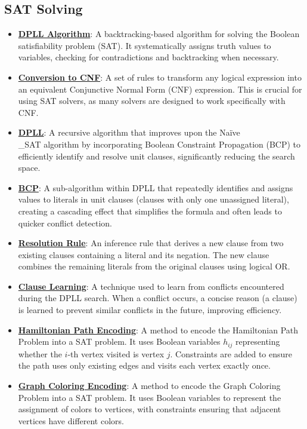 \documentclass{article}%
\begin{document}
\subsection{SAT Solving}%
\label{subsec:SATSolving}%
\begin{itemize}[leftmargin=*]%
\item \href{https://www.math.purdue.edu/~yipn/351/13L1-Logic.pdf#page=15}{\textbf{DPLL Algorithm}}: A backtracking-based algorithm for solving the Boolean satisfiability problem (SAT). It systematically assigns truth values to variables, checking for contradictions and backtracking when necessary.%
\item \href{https://www.math.purdue.edu/~yipn/351/13L1-Logic.pdf#page=17}{\textbf{Conversion to CNF}}: A set of rules to transform any logical expression into an equivalent Conjunctive Normal Form (CNF) expression. This is crucial for using SAT solvers, as many solvers are designed to work specifically with CNF.%
\item \href{https://www.math.purdue.edu/~yipn/351/15L2-SAT.pdf#page=17}{\textbf{DPLL}}: A recursive algorithm that improves upon the Naïve\\_SAT algorithm by incorporating Boolean Constraint Propagation (BCP) to efficiently identify and resolve unit clauses, significantly reducing the search space.%
\item \href{https://www.math.purdue.edu/~yipn/351/15L2-SAT.pdf#page=20}{\textbf{BCP}}: A sub-algorithm within DPLL that repeatedly identifies and assigns values to literals in unit clauses (clauses with only one unassigned literal), creating a cascading effect that simplifies the formula and often leads to quicker conflict detection.%
\item \href{https://www.math.purdue.edu/~yipn/351/15L2-SAT.pdf#page=32}{\textbf{Resolution Rule}}: An inference rule that derives a new clause from two existing clauses containing a literal and its negation. The new clause combines the remaining literals from the original clauses using logical OR.%
\item \href{https://www.math.purdue.edu/~yipn/351/15L2-SAT.pdf#page=35}{\textbf{Clause Learning}}: A technique used to learn from conflicts encountered during the DPLL search. When a conflict occurs, a concise reason (a clause) is learned to prevent similar conflicts in the future, improving efficiency.%
\item \href{https://www.math.purdue.edu/~yipn/351/15L2-SAT.pdf#page=46}{\textbf{Hamiltonian Path Encoding}}: A method to encode the Hamiltonian Path Problem into a SAT problem. It uses Boolean variables $h_{ij}$ representing whether the $i$-th vertex visited is vertex $j$. Constraints are added to ensure the path uses only existing edges and visits each vertex exactly once.%
\item \href{https://www.math.purdue.edu/~yipn/351/15L2-SAT.pdf#page=47}{\textbf{Graph Coloring Encoding}}: A method to encode the Graph Coloring Problem into a SAT problem. It uses Boolean variables to represent the assignment of colors to vertices, with constraints ensuring that adjacent vertices have different colors.%
\end{itemize}
\end{document}

